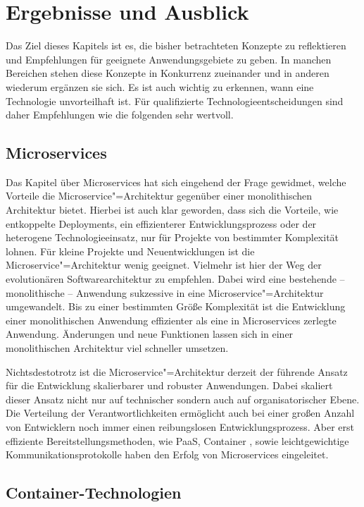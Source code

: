 \chapter{Ergebnisse und Ausblick}
\label{chap:summary}

Das Ziel dieses Kapitels ist es, die bisher betrachteten Konzepte zu reflektieren und Empfehlungen für geeignete Anwendungsgebiete zu geben. In manchen Bereichen stehen diese Konzepte in Konkurrenz zueinander und in anderen wiederum ergänzen sie sich. Es ist auch wichtig zu erkennen, wann eine Technologie unvorteilhaft ist. Für qualifizierte Technologieentscheidungen sind daher Empfehlungen wie die folgenden sehr wertvoll. 

\section{Microservices}

Das Kapitel über Microservices hat sich eingehend der Frage gewidmet, welche Vorteile die Microservice"=Architektur gegenüber einer monolithischen Architektur bietet. Hierbei ist auch klar geworden, dass sich die Vorteile, wie entkoppelte Deployments, ein effizienterer Entwicklungsprozess oder der heterogene Technologieeinsatz, nur für Projekte von bestimmter Komplexität lohnen. Für kleine Projekte und Neuentwicklungen ist die Microservice"=Architektur wenig geeignet. Vielmehr ist hier der Weg der evolutionären Softwarearchitektur zu empfehlen. Dabei wird eine bestehende -- \zB monolithische -- Anwendung sukzessive in eine Microservice"=Architektur umgewandelt. Bis zu einer bestimmten Größe \bzw Komplexität ist die Entwicklung einer monolithischen Anwendung effizienter als eine in Microservices zerlegte Anwendung. Änderungen und neue Funktionen lassen sich in einer monolithischen Architektur viel schneller umsetzen.

Nichtsdestotrotz ist die Microservice"=Architektur derzeit der führende Ansatz für die Entwicklung skalierbarer und robuster Anwendungen. Dabei skaliert dieser Ansatz nicht nur auf technischer sondern auch auf organisatorischer Ebene. Die Verteilung der Verantwortlichkeiten ermöglicht auch bei einer großen Anzahl von Entwicklern noch immer einen reibungslosen Entwicklungsprozess. Aber erst effiziente Bereitstellungsmethoden, wie PaaS, Container \ua, sowie leichtgewichtige Kommunikationsprotokolle haben den Erfolg von Microservices eingeleitet.

\section{Container-Technologien}

